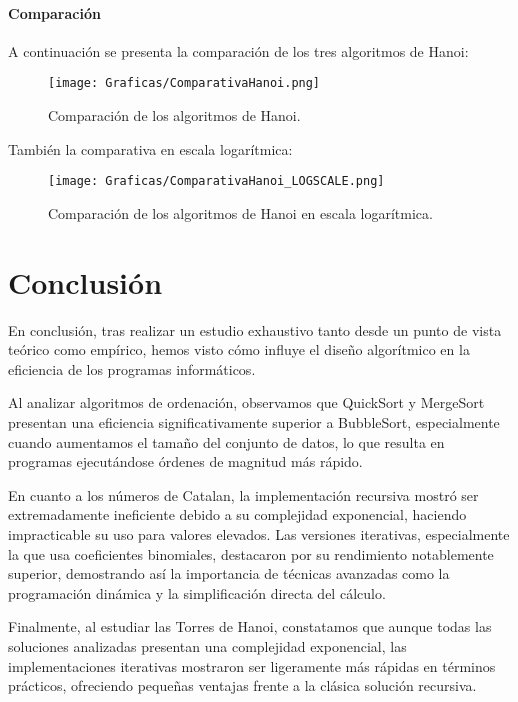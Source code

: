 \documentclass[a4paper,12pt]{article} %
\begin{document}
\paragraph{Comparación}

A continuación se presenta la comparación de los tres algoritmos de Hanoi:

\begin{figure}[H]
	\centering
	\texttt{[image: Graficas/ComparativaHanoi.png]}
	\caption{Comparación de los algoritmos de Hanoi.}
\end{figure}

También la comparativa en escala logarítmica:

\begin{figure}[H]
	\centering
	\texttt{[image: Graficas/ComparativaHanoi\_LOGSCALE.png]}
	\caption{Comparación de los algoritmos de Hanoi en escala logarítmica.}
\end{figure}

\section{Conclusión}
En conclusión, tras realizar un estudio exhaustivo tanto desde un punto de vista teórico como empírico, 
hemos visto cómo influye el diseño algorítmico en la eficiencia de los programas informáticos.

Al analizar algoritmos de ordenación, observamos que QuickSort y MergeSort presentan una eficiencia 
significativamente superior a BubbleSort, especialmente cuando aumentamos el tamaño del conjunto de datos, 
lo que resulta en programas ejecutándose órdenes de magnitud más rápido. 

En cuanto a los números de Catalan, la implementación recursiva mostró ser extremadamente ineficiente debido a su
complejidad exponencial, haciendo impracticable su uso para valores elevados. Las versiones iterativas, especialmente
la que usa coeficientes binomiales, destacaron por su rendimiento notablemente superior, demostrando así la importancia 
de técnicas avanzadas como la programación dinámica y la simplificación directa del cálculo.

Finalmente, al estudiar las Torres de Hanoi, constatamos que aunque todas las soluciones analizadas presentan una 
complejidad exponencial, las implementaciones iterativas mostraron ser ligeramente más rápidas en términos prácticos, ofreciendo 
pequeñas ventajas frente a la clásica solución recursiva.
\end{document}
